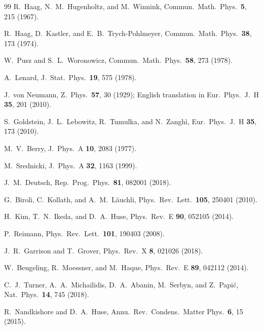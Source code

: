 \documentclass[10pt,a4paper]{article}
\begin{document}
\begin{thebibliography}{99}
R.~Haag, N.~M.~Hugenholtz, and M.~Winnink, Commun.\ Math.\ Phys.\ \textbf{5}, 215 (1967).

R.~Haag, D.~Kastler, and E.~B.~Trych-Pohlmeyer, Commun.\ Math.\ Phys.\ \textbf{38}, 173 (1974).

W.~Pusz and S.~L.~Woronowicz, Commun.\ Math.\ Phys.\ \textbf{58}, 273 (1978).

A.~Lenard, J.~Stat.\ Phys.\ \textbf{19}, 575 (1978).

J.~von Neumann, Z.~Phys.\ \textbf{57}, 30 (1929); English translation in Eur.\ Phys.\ J.\ H \textbf{35}, 201 (2010).

S.~Goldstein, J.~L.~Lebowitz, R.~Tumulka, and N.~Zangh\`i, Eur.\ Phys.\ J.\ H \textbf{35}, 173 (2010).

M.~V.~Berry, J.~Phys.\ A \textbf{10}, 2083 (1977).

M.~Srednicki, J.~Phys.\ A \textbf{32}, 1163 (1999).

J.~M.~Deutsch, Rep.\ Prog.\ Phys.\ \textbf{81}, 082001 (2018).

G.~Biroli, C.~Kollath, and A.~M.~L\"auchli, Phys.\ Rev.\ Lett.\ \textbf{105}, 250401 (2010).

H.~Kim, T.~N.~Ikeda, and D.~A.~Huse, Phys.\ Rev.\ E \textbf{90}, 052105 (2014).

P.~Reimann, Phys.\ Rev.\ Lett.\ \textbf{101}, 190403 (2008).

J.~R.~Garrison and T.~Grover, Phys.\ Rev.\ X \textbf{8}, 021026 (2018).

W.~Beugeling, R.~Moessner, and M.~Haque, Phys.\ Rev.\ E \textbf{89}, 042112 (2014).

C.~J.~Turner, A.~A.~Michailidis, D.~A.~Abanin, M.~Serbyn, and Z.~Papi\'c, Nat.\ Phys.\ \textbf{14}, 745 (2018).

R.~Nandkishore and D.~A.~Huse, Annu.\ Rev.\ Condens.\ Matter Phys.\ \textbf{6}, 15 (2015).

\end{thebibliography}
\end{document}
